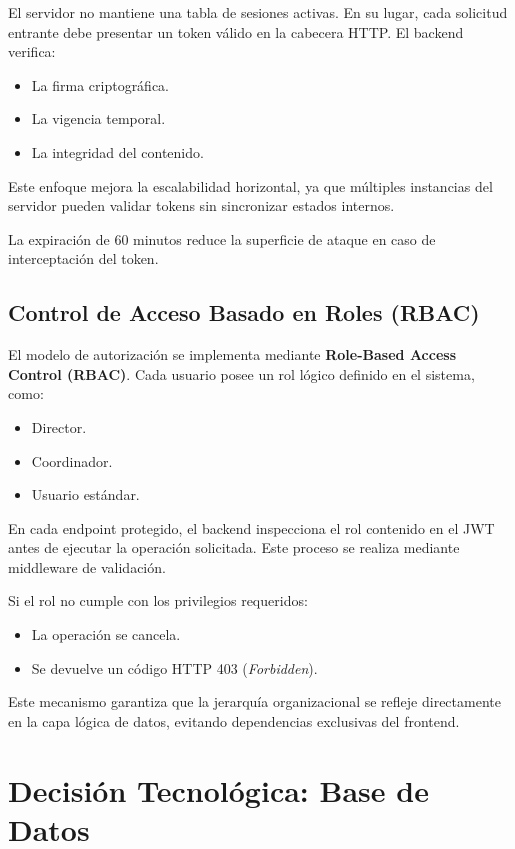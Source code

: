 \documentclass[12pt,letterpaper]{article}
\begin{document}
El servidor no mantiene una tabla de sesiones activas. En su lugar, cada solicitud entrante debe presentar un token válido en la cabecera HTTP. El backend verifica:
\begin{itemize}
    \item La firma criptográfica.
    \item La vigencia temporal.
    \item La integridad del contenido.
\end{itemize}

Este enfoque mejora la escalabilidad horizontal, ya que múltiples instancias del servidor pueden validar tokens sin sincronizar estados internos.

La expiración de 60 minutos reduce la superficie de ataque en caso de interceptación del token.

\subsection{Control de Acceso Basado en Roles (RBAC)}

El modelo de autorización se implementa mediante \textbf{Role-Based Access Control (RBAC)}. Cada usuario posee un rol lógico definido en el sistema, como:
\begin{itemize}
    \item Director.
    \item Coordinador.
    \item Usuario estándar.
\end{itemize}

En cada endpoint protegido, el backend inspecciona el rol contenido en el JWT antes de ejecutar la operación solicitada. Este proceso se realiza mediante middleware de validación.

Si el rol no cumple con los privilegios requeridos:
\begin{itemize}
    \item La operación se cancela.
    \item Se devuelve un código HTTP 403 (\textit{Forbidden}).
\end{itemize}

Este mecanismo garantiza que la jerarquía organizacional se refleje directamente en la capa lógica de datos, evitando dependencias exclusivas del frontend.

\section{Decisión Tecnológica: Base de Datos}
\end{document}
